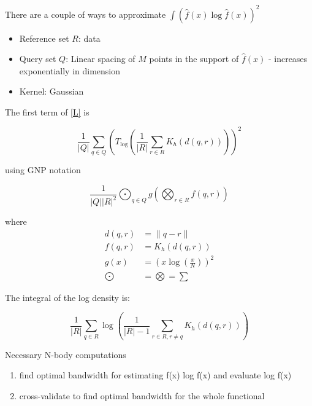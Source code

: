 \documentclass{article}
\begin{document}
  There are a couple of ways to approximate $ \int (\hat{f}(x) \log \hat{f}(x))^2  $
  \begin{itemize}
  \item Reference set $R$: data
  \item Query set $Q$: Linear spacing of $M$ points in the support of $ \hat{f}(x) $ - increases exponentially in dimension
  \item Kernel: Gaussian
  \end{itemize}

  
  The first term of \eqref{L} is

  \begin{displaymath}
    \frac{1}{\vert Q \vert} \sum_{q \in Q} \left( T_{\log} \left( \frac{1}{\vert R \vert} \sum_{r \in R} K_h(d(q,r)) \right) \right) ^2
  \end{displaymath}



  using GNP notation

  \begin{displaymath}
    \frac{1}{\vert Q \vert \vert R \vert ^2} \bigodot_{q \in Q} g\left(\bigotimes_{r \in R} f(q,r)\right)
  \end{displaymath}

  where
  \begin{align*}
    d(q,r) & = \| q - r \| \\
    f(q,r) & = K_h(d(q,r)) \\
    g(x) & = \left( x \log \left( \frac{x}{N} \right) \right)^2 \\
    \bigodot & = \bigotimes = \sum
  \end{align*}


  The integral of the log density is:

  \begin{displaymath}
    \frac{1}{\vert R \vert} \sum_{q \in R} \log \left( \frac{1}{\vert R \vert - 1} \sum_{r \in R, r \neq q} K_h(d(q,r)) \right)
  \end{displaymath}

  
  
  Necessary N-body computations
  \begin{enumerate}
  \item find optimal bandwidth for estimating f(x) log f(x) and evaluate log f(x)
  \item cross-validate to find optimal bandwidth for the whole functional
  \end{enumerate}
\end{document}

